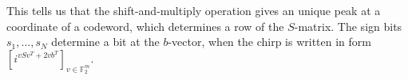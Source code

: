 \documentclass{article}
\begin{document}
	This tells us that the shift-and-multiply operation gives an unique peak at a coordinate of a codeword, which determines a row of the $S$-matrix. The sign bits $s_1,...,s_N$ determine a bit at the $b$-vector, when the chirp is written in form $\left[i^{vSv^T + 2vb^T}\right]_{v \in \mathbb{F}^m_2}$.
	
\end{document}
